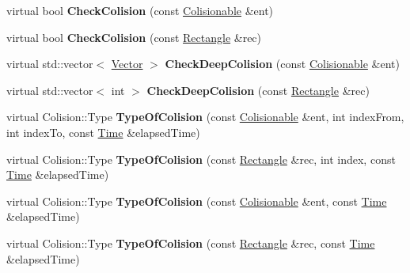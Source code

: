 \begin{DoxyCompactItemize}
\item 
\hypertarget{classColisionable_ab4d827408fd136a4ccd1d188492d907e}{virtual bool {\bfseries Check\-Colision} (const \hyperlink{classColisionable}{Colisionable} \&ent)}\label{classColisionable_ab4d827408fd136a4ccd1d188492d907e}

\item 
\hypertarget{classColisionable_a568ec4a1fb2d412c19a1416309b967b5}{virtual bool {\bfseries Check\-Colision} (const \hyperlink{classRectangle}{Rectangle} \&rec)}\label{classColisionable_a568ec4a1fb2d412c19a1416309b967b5}

\item 
\hypertarget{classColisionable_a6d799e9995e2e635461e66d74bf8fd5c}{virtual std\-::vector$<$ \hyperlink{classVector}{Vector} $>$ {\bfseries Check\-Deep\-Colision} (const \hyperlink{classColisionable}{Colisionable} \&ent)}\label{classColisionable_a6d799e9995e2e635461e66d74bf8fd5c}

\item 
\hypertarget{classColisionable_ac2a8556867c95d6174965768dc7b7c2f}{virtual std\-::vector$<$ int $>$ {\bfseries Check\-Deep\-Colision} (const \hyperlink{classRectangle}{Rectangle} \&rec)}\label{classColisionable_ac2a8556867c95d6174965768dc7b7c2f}

\item 
\hypertarget{classColisionable_a1058ee9817cbce361a5af71a9b29d40a}{virtual Colision\-::\-Type {\bfseries Type\-Of\-Colision} (const \hyperlink{classColisionable}{Colisionable} \&ent, int index\-From, int index\-To, const \hyperlink{classTime}{Time} \&elapsed\-Time)}\label{classColisionable_a1058ee9817cbce361a5af71a9b29d40a}

\item 
\hypertarget{classColisionable_abf660cb4fb76c044424efbd06f7c1e97}{virtual Colision\-::\-Type {\bfseries Type\-Of\-Colision} (const \hyperlink{classRectangle}{Rectangle} \&rec, int index, const \hyperlink{classTime}{Time} \&elapsed\-Time)}\label{classColisionable_abf660cb4fb76c044424efbd06f7c1e97}

\item 
\hypertarget{classColisionable_a7863f7dfc211812f380547bcd73b7a41}{virtual Colision\-::\-Type {\bfseries Type\-Of\-Colision} (const \hyperlink{classColisionable}{Colisionable} \&ent, const \hyperlink{classTime}{Time} \&elapsed\-Time)}\label{classColisionable_a7863f7dfc211812f380547bcd73b7a41}

\item 
\hypertarget{classColisionable_abce19bbf1e92890ffc54abbc892adbc1}{virtual Colision\-::\-Type {\bfseries Type\-Of\-Colision} (const \hyperlink{classRectangle}{Rectangle} \&rec, const \hyperlink{classTime}{Time} \&elapsed\-Time)}\label{classColisionable_abce19bbf1e92890ffc54abbc892adbc1}


\end{DoxyCompactItemize}
